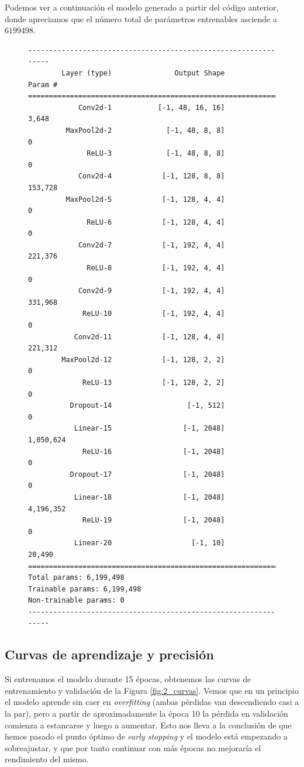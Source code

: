 \documentclass[11pt]{article}
\begin{document}
Podemos ver a continuación el modelo generado a partir del código anterior, donde apreciamos que el número total de parámetros entrenables asciende a $6199498$.
\vspace{1em}
\begin{figure}[h!]
  \centering
  \begin{varwidth}{\linewidth}
\begin{verbatim}
----------------------------------------------------------------
        Layer (type)               Output Shape         Param #
================================================================
            Conv2d-1           [-1, 48, 16, 16]           3,648
         MaxPool2d-2             [-1, 48, 8, 8]               0
              ReLU-3             [-1, 48, 8, 8]               0
            Conv2d-4            [-1, 128, 8, 8]         153,728
         MaxPool2d-5            [-1, 128, 4, 4]               0
              ReLU-6            [-1, 128, 4, 4]               0
            Conv2d-7            [-1, 192, 4, 4]         221,376
              ReLU-8            [-1, 192, 4, 4]               0
            Conv2d-9            [-1, 192, 4, 4]         331,968
             ReLU-10            [-1, 192, 4, 4]               0
           Conv2d-11            [-1, 128, 4, 4]         221,312
        MaxPool2d-12            [-1, 128, 2, 2]               0
             ReLU-13            [-1, 128, 2, 2]               0
          Dropout-14                  [-1, 512]               0
           Linear-15                 [-1, 2048]       1,050,624
             ReLU-16                 [-1, 2048]               0
          Dropout-17                 [-1, 2048]               0
           Linear-18                 [-1, 2048]       4,196,352
             ReLU-19                 [-1, 2048]               0
           Linear-20                   [-1, 10]          20,490
================================================================
Total params: 6,199,498
Trainable params: 6,199,498
Non-trainable params: 0
----------------------------------------------------------------
\end{verbatim}
\end{varwidth}
\end{figure}

\subsection*{Curvas de aprendizaje y precisión}

Si entrenamos el modelo durante 15 épocas, obtenemos las curvas de entrenamiento y validación de la Figura \ref{fig:2_curvas}. Vemos que en un principio el modelo aprende sin caer en \textit{overfitting} (ambas pérdidas van descendiendo casi a la par), pero a partir de aproximadamente la época 10 la pérdida en validación comienza a estancarse y luego a aumentar. Esto nos lleva a la conclusión de que hemos pasado el punto óptimo de \textit{early stopping} y el modelo está empezando a sobreajustar, y que por tanto continuar con más épocas no mejoraría el rendimiento del mismo.
\end{document}
